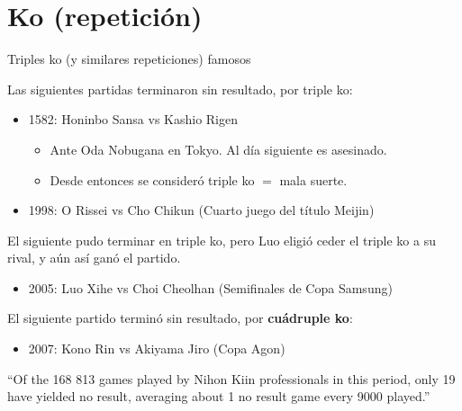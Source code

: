 \documentclass{beamer}
\begin{document}
\section{Ko (repetición)}

\begin{frame}{Triples ko (y similares repeticiones) famosos}
  
  Las siguientes partidas terminaron sin resultado, por triple ko:
  
  \begin{itemize}
    \item 1582: Honinbo Sansa vs Kashio Rigen
       \begin{itemize}
         \item Ante Oda Nobugana en Tokyo. Al día siguiente es asesinado.
         \item Desde entonces se consideró triple ko $=$ mala suerte.
       \end{itemize}
    \item 1998: O Rissei vs Cho Chikun (Cuarto juego del título Meijin)
  \end{itemize}
  
  El siguiente pudo terminar en triple ko, pero Luo eligió ceder el triple ko a su rival, y aún así ganó el partido.
  
  \begin{itemize}
     \item 2005: Luo Xihe vs Choi Cheolhan (Semifinales de Copa Samsung)
  \end{itemize}
  
  El siguiente partido terminó sin resultado, por \textbf{cuádruple ko}:
  
  \begin{itemize}
     \item 2007: Kono Rin vs Akiyama Jiro (Copa Agon)
  \end{itemize}
  
  ``Of the 168 813 games played by Nihon Kiin professionals in this period, only 19 have yielded no result, averaging about 1 no result game every 9000 played.''
  
  
  
\end{frame}
\end{document}
